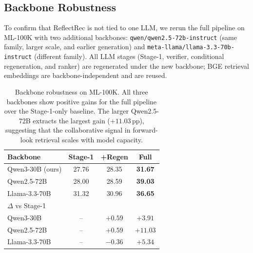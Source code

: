 \documentclass[11pt]{article}
\begin{document}
\subsection{Backbone Robustness}
\label{sec:backbone}

To confirm that ReflectRec is not tied to one LLM, we rerun the full pipeline on ML-100K with two additional backbones: \texttt{qwen/qwen2.5-72b-instruct} (same family, larger scale, and earlier generation) and \texttt{meta-llama/llama-3.3-70b-instruct} (different family). All LLM stages (Stage-1, verifier, conditional regeneration, and ranker) are regenerated under the new backbone; BGE retrieval embeddings are backbone-independent and are reused.

\begin{table}[!t]
\centering
\small
\setlength{\tabcolsep}{7pt}
\begin{tabular}{lccc}
\toprule
\textbf{Backbone} & \textbf{Stage-1} & \textbf{+Regen} & \textbf{Full} \\
\midrule
Qwen3-30B (ours) & 27.76 & 28.35 & \textbf{31.67}\\
Qwen2.5-72B            & 28.00 & 28.59 & \textbf{39.03}\\
Llama-3.3-70B          & 31.32 & 30.96 & \textbf{36.65}\\
\midrule
$\Delta$ vs Stage-1 & & & \\
\quad Qwen3-30B  & --     & $+0.59$  & $+3.91$\\
\quad Qwen2.5-72B & --     & $+0.59$  & $+11.03$\\
\quad Llama-3.3-70B & --   & $-0.36$  & $+5.34$\\
\bottomrule
\end{tabular}
\caption{Backbone robustness on ML-100K. All three backbones show positive gains for the full pipeline over the Stage-1-only baseline. The larger Qwen2.5-72B extracts the largest gain ($+11.03$\,pp), suggesting that the collaborative signal in forward-look retrieval scales with model capacity.}
\label{tab:backbone}
\end{table}

\end{document}

